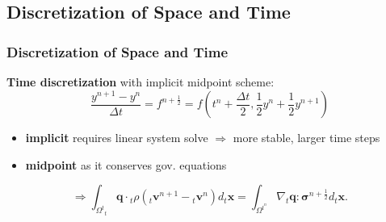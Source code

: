 \documentclass{beamer}
\begin{document}
\subsection{Discretization of Space and Time}
\begin{frame}
\frametitle{Discretization of Space and Time}
\textbf{Time discretization} with implicit midpoint scheme:
  \begin{equation}
    \frac { y ^ { n + 1 } - y ^ { n } } { \Delta t } = f ^ { n + \frac{1}{2} } = f \left( t ^ { n } + \frac{\Delta t}{2}, \frac{1}{2} y ^ { n } + \frac{1}{2} y ^ { n + 1 } \right)
  \end{equation}
\begin{itemize}
  \item \textbf{implicit} requires linear system solve $\Rightarrow$ more stable, larger time steps
  \item \textbf{midpoint} as it conserves gov. equations
\end{itemize}

  \begin{equation}
    \Rightarrow \int _ { \Omega ^ { t } } _t\boldsymbol{q} \cdot {}_t\rho(_t\boldsymbol{v}^{n+1}-{}_t\boldsymbol{v}^{n}) d _t\boldsymbol{x}= \int _ { \Omega ^ { t^n} } \nabla {}_t\boldsymbol{q} : \boldsymbol{\sigma}^{n+\frac{1}{2}}  d_t\boldsymbol{x}.
  \end{equation}
\end{frame}
\end{document}
